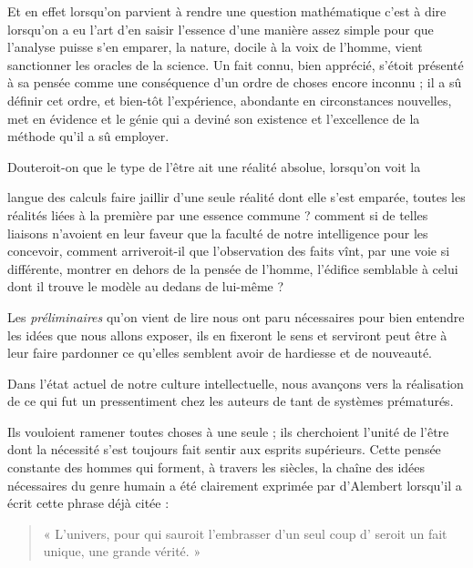 \documentclass[11pt,a4paper]{article}
\begin{document}
Et en effet lorsqu'on parvient à rendre une question mathématique c'est
à dire lorsqu'on a eu l'art d'en saisir l'essence d'une manière assez
simple pour que l'analyse puisse s'en emparer, la nature, docile à la
voix de l'homme, vient sanctionner les oracles de la science. Un fait
connu, bien apprécié, s'étoit présenté à sa pensée comme une conséquence
d'un ordre de choses encore inconnu ; il a sû définir cet ordre, et
bien-tôt l'expérience, abondante en circonstances nouvelles, met en
évidence et le génie qui a deviné son existence et l'excellence de la
méthode qu'il a sû  employer.

Douteroit-on que le type de l'être ait une réalité absolue, lorsqu'on
voit la

langue des calculs faire jaillir d'une seule réalité dont elle s'est
emparée, toutes les réalités liées à la première par une essence
commune ? comment si de telles liaisons n'avoient en leur faveur que la
faculté de notre intelligence pour les concevoir, comment arriveroit-il
que l'observation des faits vînt, par une voie si différente, montrer en
dehors de la pensée de l'homme, l'édifice  semblable à celui dont il trouve le modèle au dedans de
lui-même ?

Les \emph{préliminaires} qu'on vient de lire nous ont paru nécessaires
pour bien entendre les idées que nous allons exposer, ils en fixeront le
sens et serviront peut être à leur faire pardonner ce qu'elles semblent
avoir de hardiesse et de nouveauté.

Dans l'état actuel de notre culture intellectuelle, nous avançons vers
la réalisation de ce qui fut un pressentiment chez les auteurs de tant
de systèmes prématurés.

Ils vouloient ramener toutes choses à une seule ; ils cherchoient
l'unité de l'être dont la nécessité s'est toujours fait sentir aux
esprits supérieurs. Cette pensée constante des hommes qui forment, à
travers les siècles, la chaîne des idées nécessaires du genre humain a
été clairement exprimée par d'Alembert lorsqu'il a écrit cette phrase
déjà citée :

\begin{quote}
« L'univers, pour qui sauroit l'embrasser d'un seul coup
d' seroit un fait unique, une grande vérité. »
\end{quote}
\end{document}
